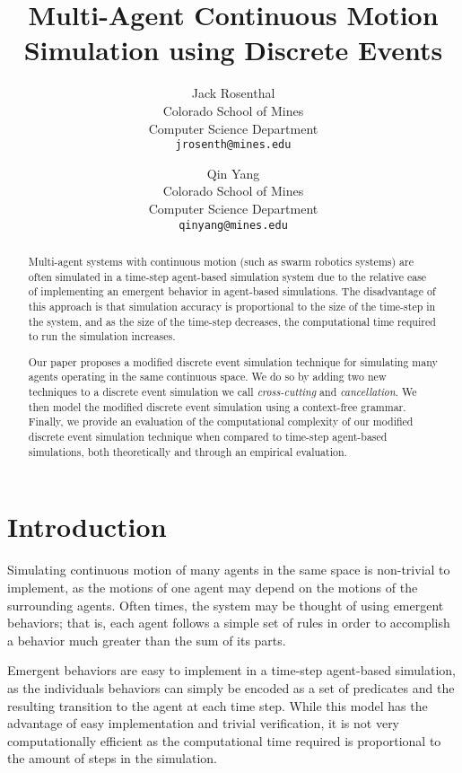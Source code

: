 \documentclass[conference,letterpaper]{IEEEtran}
\title{Multi-Agent Continuous Motion Simulation using Discrete Events}
\author{%
    Jack Rosenthal \\
    Colorado School of Mines \\
    Computer Science Department \\
    \texttt{jrosenth@mines.edu}
    \and
    Qin Yang \\
    Colorado School of Mines \\
    Computer Science Department \\
    \texttt{qinyang@mines.edu}}
\begin{document}
\maketitle
\thispagestyle{fancyplain}
\pagestyle{fancyplain}

\begin{abstract}
    Multi-agent systems with continuous motion (such as swarm robotics systems)
    are often simulated in a time-step agent-based simulation system due to the
    relative ease of implementing an emergent behavior in agent-based
    simulations. The disadvantage of this approach is that simulation accuracy
    is proportional to the size of the time-step in the system, and as the size
    of the time-step decreases, the computational time required to run the
    simulation increases.

    Our paper proposes a modified discrete event simulation technique for
    simulating many agents operating in the same continuous space. We do so by
    adding two new techniques to a discrete event simulation we call
    \emph{cross-cutting} and \emph{cancellation}. We then model the modified
    discrete event simulation using a context-free grammar. Finally, we provide
    an evaluation of the computational complexity of our modified discrete
    event simulation technique when compared to time-step agent-based
    simulations, both theoretically and through an empirical evaluation.
\end{abstract}

\section{Introduction}

Simulating continuous motion of many agents in the same space is non-trivial to
implement, as the motions of one agent may depend on the motions of the
surrounding agents. Often times, the system may be thought of using emergent
behaviors; that is, each agent follows a simple set of rules in order to
accomplish a behavior much greater than the sum of its parts.

Emergent behaviors are easy to implement in a time-step agent-based simulation,
as the individuals behaviors can simply be encoded as a set of predicates and
the resulting transition to the agent at each time step. While this model has
the advantage of easy implementation and trivial verification, it is not very
computationally efficient as the computational time required is proportional to
the amount of steps in the simulation.
\end{document}
